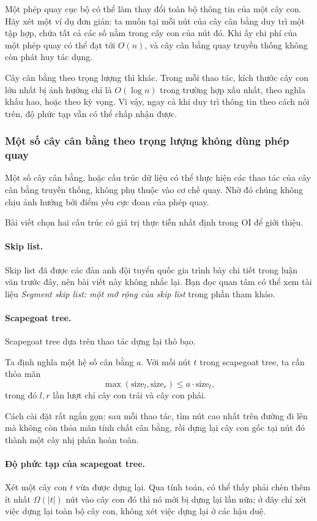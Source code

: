 \documentclass[11pt]{article}
\begin{document}
Một phép quay cục bộ có thể làm thay đổi toàn bộ thông tin của một cây con.
Hãy xét một ví dụ đơn giản: ta muốn tại
mỗi nút của cây cân bằng duy trì một tập hợp, chứa tất cả các số nằm trong
cây con của nút đó. Khi ấy chi phí của một phép quay có thể đạt tới
\(O(n)\), và cây cân bằng quay truyền thống không còn phát huy tác dụng.

Cây cân bằng theo trọng lượng thì khác. Trong mỗi thao tác, kích thước cây
con lớn nhất bị ảnh hưởng chỉ là \(O(\log n)\) trong trường hợp xấu nhất,
theo nghĩa khấu hao, hoặc theo kỳ vọng. Vì vậy, ngay cả khi duy trì thông
tin theo cách nói trên, độ phức tạp vẫn có thể chấp nhận được.

\subsubsection{Một số cây cân bằng theo trọng lượng không dùng phép quay}

Một số cây cân bằng, hoặc cấu trúc dữ liệu có thể thực hiện các thao tác của
cây cân bằng truyền thống, không phụ thuộc vào cơ chế quay. Nhờ đó chúng
không chịu ảnh hưởng bởi điểm yếu cực đoan của phép quay.

Bài viết chọn hai cấu trúc có giá trị thực tiễn nhất định trong OI để giới
thiệu.

\paragraph{Skip list.}
Skip list đã được các đàn anh đội tuyển quốc gia trình bày chi tiết trong
luận văn trước đây, nên bài viết này không nhắc lại. Bạn đọc quan tâm có
thể xem tài liệu \emph{Segment skip list: một mở rộng của skip list} trong
phần tham khảo.

\paragraph{Scapegoat tree.}
Scapegoat tree dựa trên thao tác dựng lại thô bạo.

Ta định nghĩa một hệ số cân bằng \(a\). Với mỗi nút \(t\) trong scapegoat
tree, ta cần thỏa mãn
\[
  \max(\mathrm{size}_l,\mathrm{size}_r)\le a\cdot \mathrm{size}_t,
\]
trong đó \(l,r\) lần lượt chỉ cây con trái và cây con phải.

Cách cài đặt rất ngắn gọn: sau mỗi thao tác, tìm nút cao nhất trên đường đi
lên mà không còn thỏa mãn tính chất cân bằng, rồi dựng lại cây con gốc tại
nút đó thành một cây nhị phân hoàn toàn.

\paragraph{Độ phức tạp của scapegoat tree.}
Xét một cây con \(t\) vừa được dựng lại. Qua tính toán, có thể thấy phải
chèn thêm ít nhất \(\Omega(|t|)\) nút vào cây con đó thì nó mới bị dựng lại
lần nữa; ở đây chỉ xét việc dựng lại toàn bộ cây con, không xét việc dựng
lại ở các hậu duệ.
\end{document}
